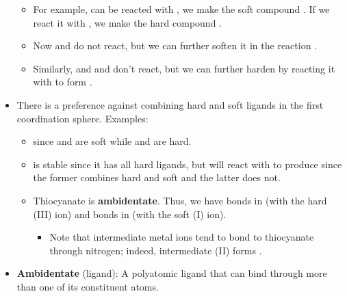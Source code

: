 \documentclass[../notes.tex]{subfiles}
\begin{document}
\begin{itemize}
    \begin{itemize}
        \item For example,  can be reacted with , we make the soft compound . If we react it with , we make the hard compound .
        \item Now  and  do not react, but we can further soften it in the reaction .
        \item Similarly,  and and  don't react, but we can further harden  by reacting it with  to form .
    \end{itemize}
    \item There is a preference against combining hard and soft ligands in the first coordination sphere. Examples:
    \begin{itemize}
        \item {} since  and  are soft while  and  are hard.
        \item {} is stable since it has all hard ligands, but  will react with  to produce  since the former combines hard and soft and the latter does not.
        \item Thiocyanate is \textbf{ambidentate}. Thus, we have  bonds in  (with the hard  (III) ion) and  bonds in  (with the soft  (I) ion).
        \begin{itemize}
            \item Note that intermediate metal ions tend to bond to thiocyanate through nitrogen; indeed, intermediate  (II) forms .
        \end{itemize}
    \end{itemize}
    \item \textbf{Ambidentate} (ligand): A polyatomic ligand that can bind through more than one of its constituent atoms.
\end{itemize}
\end{document}
